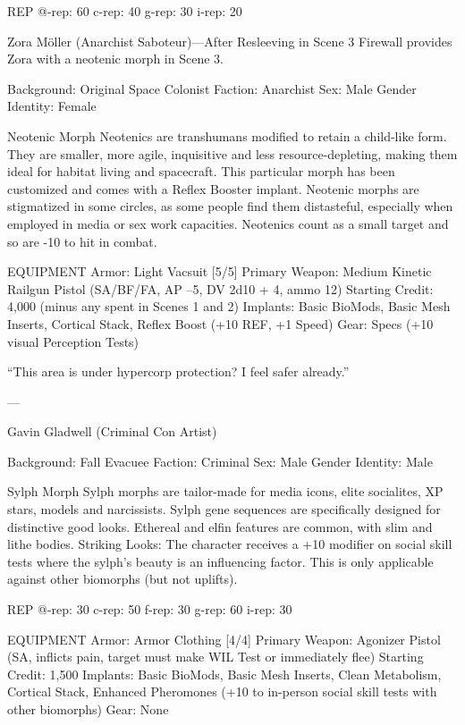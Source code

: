 ﻿%

   REP
   @-rep:	60
   c-rep:	40
   g-rep:	30
   i-rep:	20

Zora Möller (Anarchist Saboteur)—After Resleeving in Scene 3
Firewall provides Zora with a neotenic morph in Scene 3.

Background: Original Space Colonist
Faction: Anarchist
Sex: Male
Gender Identity: Female

Neotenic Morph
Neotenics are transhumans modified to retain a child-like form. They are smaller, more agile, inquisitive and less resource-depleting, making them ideal for habitat living and spacecraft. This particular morph has been customized and comes with a Reflex Booster implant. Neotenic morphs are stigmatized in some circles, as some people find them distasteful, especially when employed in media or sex work capacities. Neotenics count as a small target and so are -10 to hit in combat.

EQUIPMENT
Armor: Light Vacsuit [5/5]
Primary Weapon: Medium Kinetic Railgun Pistol (SA/BF/FA, AP –5, DV 2d10 + 4, ammo 12)
Starting Credit: 4,000 (minus any spent in Scenes 1 and 2)
Implants: Basic BioMods, Basic Mesh Inserts, Cortical Stack, Reflex Boost (+10 REF, +1 Speed)
Gear: Specs (+10 visual Perception Tests)

“This area is under hypercorp protection? I feel safer already.”

---

Gavin Gladwell (Criminal Con Artist)

Background: Fall Evacuee
Faction: Criminal
Sex: Male
Gender Identity: Male

Sylph Morph
Sylph morphs are tailor-made for media icons, elite socialites, XP stars, models and narcissists. Sylph gene sequences are specifically designed for distinctive good looks. Ethereal and elfin features are common, with slim and lithe bodies.
Striking Looks: The character receives a +10 modifier on social skill tests where the sylph's beauty is an influencing factor. This is only applicable against other biomorphs (but not uplifts).

REP
@-rep:	30
c-rep:	50
f-rep:	30
g-rep:	60
i-rep:	30

EQUIPMENT
Armor: Armor Clothing [4/4]
Primary Weapon: Agonizer Pistol (SA, inflicts pain, target must make WIL Test or immediately flee)
Starting Credit: 1,500
Implants: Basic BioMods, Basic Mesh Inserts, Clean Metabolism, Cortical Stack, Enhanced Pheromones (+10 to in-person social skill tests with other biomorphs)
Gear: None


